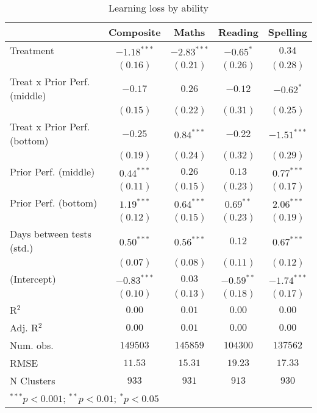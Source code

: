 
\begin{table}
\begin{center}
\begin{tabular}{l c c c c}
\hline
 & Composite & Maths & Reading & Spelling \\
\hline
Treatment                    & $-1.18^{***}$ & $-2.83^{***}$ & $-0.65^{*}$  & $0.34$        \\
                             & $(0.16)$      & $(0.21)$      & $(0.26)$     & $(0.28)$      \\
Treat x Prior Perf. (middle) & $-0.17$       & $0.26$        & $-0.12$      & $-0.62^{*}$   \\
                             & $(0.15)$      & $(0.22)$      & $(0.31)$     & $(0.25)$      \\
Treat x Prior Perf. (bottom) & $-0.25$       & $0.84^{***}$  & $-0.22$      & $-1.51^{***}$ \\
                             & $(0.19)$      & $(0.24)$      & $(0.32)$     & $(0.29)$      \\
Prior Perf. (middle)         & $0.44^{***}$  & $0.26$        & $0.13$       & $0.77^{***}$  \\
                             & $(0.11)$      & $(0.15)$      & $(0.23)$     & $(0.17)$      \\
Prior Perf. (bottom)         & $1.19^{***}$  & $0.64^{***}$  & $0.69^{**}$  & $2.06^{***}$  \\
                             & $(0.12)$      & $(0.15)$      & $(0.23)$     & $(0.19)$      \\
Days between tests (std.)    & $0.50^{***}$  & $0.56^{***}$  & $0.12$       & $0.67^{***}$  \\
                             & $(0.07)$      & $(0.08)$      & $(0.11)$     & $(0.12)$      \\
(Intercept)                  & $-0.83^{***}$ & $0.03$        & $-0.59^{**}$ & $-1.74^{***}$ \\
                             & $(0.10)$      & $(0.13)$      & $(0.18)$     & $(0.17)$      \\
\hline
R$^2$                        & $0.00$        & $0.01$        & $0.00$       & $0.00$        \\
Adj. R$^2$                   & $0.00$        & $0.01$        & $0.00$       & $0.00$        \\
Num. obs.                    & $149503$      & $145859$      & $104300$     & $137562$      \\
RMSE                         & $11.53$       & $15.31$       & $19.23$      & $17.33$       \\
N Clusters                   & $933$         & $931$         & $913$        & $930$         \\
\hline
\multicolumn{5}{l}{\scriptsize{$^{***}p<0.001$; $^{**}p<0.01$; $^{*}p<0.05$}}
\end{tabular}
\caption{Learning loss by ability}
\label{tableability}
\end{center}
\end{table}
